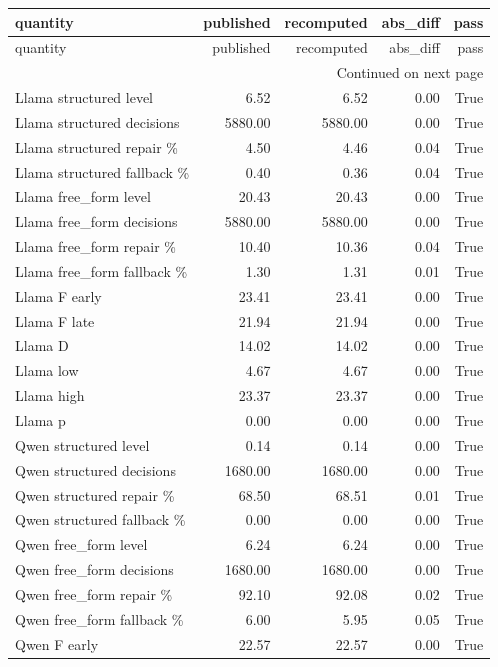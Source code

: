 \begin{longtable}{lrrrr}
\toprule
quantity & published & recomputed & abs\_diff & pass \\
\midrule
\endfirsthead
\toprule
quantity & published & recomputed & abs\_diff & pass \\
\midrule
\endhead
\midrule
\multicolumn{5}{r}{Continued on next page} \\
\midrule
\endfoot
\bottomrule
\endlastfoot
Llama structured level & 6.52 & 6.52 & 0.00 & True \\
Llama structured decisions & 5880.00 & 5880.00 & 0.00 & True \\
Llama structured repair \% & 4.50 & 4.46 & 0.04 & True \\
Llama structured fallback \% & 0.40 & 0.36 & 0.04 & True \\
Llama free\_form level & 20.43 & 20.43 & 0.00 & True \\
Llama free\_form decisions & 5880.00 & 5880.00 & 0.00 & True \\
Llama free\_form repair \% & 10.40 & 10.36 & 0.04 & True \\
Llama free\_form fallback \% & 1.30 & 1.31 & 0.01 & True \\
Llama F early & 23.41 & 23.41 & 0.00 & True \\
Llama F late & 21.94 & 21.94 & 0.00 & True \\
Llama D & 14.02 & 14.02 & 0.00 & True \\
Llama low & 4.67 & 4.67 & 0.00 & True \\
Llama high & 23.37 & 23.37 & 0.00 & True \\
Llama p & 0.00 & 0.00 & 0.00 & True \\
Qwen structured level & 0.14 & 0.14 & 0.00 & True \\
Qwen structured decisions & 1680.00 & 1680.00 & 0.00 & True \\
Qwen structured repair \% & 68.50 & 68.51 & 0.01 & True \\
Qwen structured fallback \% & 0.00 & 0.00 & 0.00 & True \\
Qwen free\_form level & 6.24 & 6.24 & 0.00 & True \\
Qwen free\_form decisions & 1680.00 & 1680.00 & 0.00 & True \\
Qwen free\_form repair \% & 92.10 & 92.08 & 0.02 & True \\
Qwen free\_form fallback \% & 6.00 & 5.95 & 0.05 & True \\
Qwen F early & 22.57 & 22.57 & 0.00 & True \\

\end{longtable}
